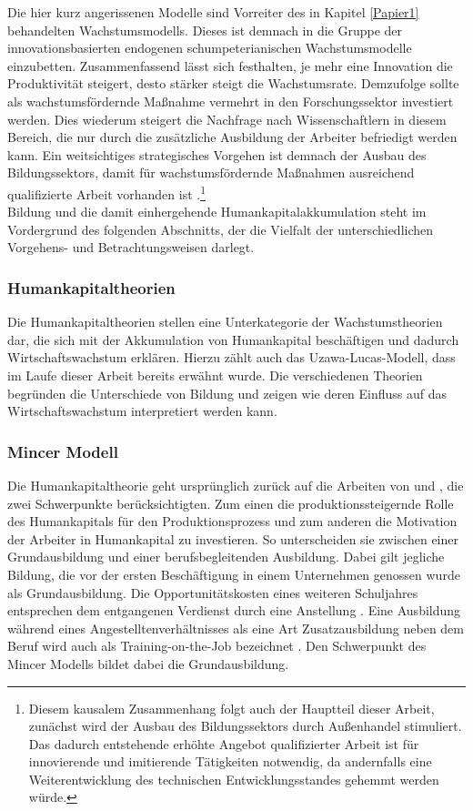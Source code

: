 %
Die hier kurz angerissenen Modelle sind Vorreiter des in Kapitel \ref{Papier1} behandelten Wachstumsmodells. Dieses ist demnach in die Gruppe der innovationsbasierten endogenen schumpeterianischen Wachstumsmodelle einzubetten. 
%
Zusammenfassend lässt sich festhalten, je mehr eine Innovation die Produktivität steigert, desto stärker steigt die Wachstumsrate. Demzufolge sollte als wachstumsfördernde Maßnahme vermehrt in den Forschungssektor investiert werden. Dies wiederum steigert die Nachfrage nach Wissenschaftlern in diesem Bereich, die nur durch die zusätzliche Ausbildung der Arbeiter befriedigt werden kann. Ein weitsichtiges strategisches Vorgehen ist demnach der Ausbau des Bildungssektors, damit für wachstumsfördernde Maßnahmen ausreichend qualifizierte Arbeit vorhanden ist \cite[Kapitel 4]{Aghion.2015}.\footnote{Diesem kausalem Zusammenhang folgt auch der Hauptteil dieser Arbeit, zunächst wird der Ausbau des Bildungssektors durch Außenhandel stimuliert. Das dadurch entstehende erhöhte Angebot qualifizierter Arbeit ist für innovierende und imitierende Tätigkeiten notwendig, da andernfalls eine Weiterentwicklung des technischen Entwicklungsstandes gehemmt werden würde.} \\
%
Bildung und die damit einhergehende Humankapitalakkumulation steht im Vordergrund des folgenden Abschnitts, der die Vielfalt der unterschiedlichen Vorgehens- und Betrachtungsweisen darlegt. 
%
\subsubsection{Humankapitaltheorien}
Die Humankapitaltheorien stellen eine Unterkategorie der Wachstumstheorien dar, die sich mit der Akkumulation von Humankapital beschäftigen und dadurch Wirtschaftswachstum erklären. Hierzu zählt auch das Uzawa-Lucas-Modell, dass im Laufe dieser Arbeit bereits erwähnt wurde. Die verschiedenen Theorien begründen die Unterschiede von Bildung und zeigen wie deren Einfluss auf das Wirtschaftswachstum interpretiert werden kann.
%
\subsubsection*{Mincer Modell}
Die Humankapitaltheorie geht ursprünglich zurück auf die Arbeiten von \cite{Becker.1965} und \cite{Mincer.1974}, die zwei Schwerpunkte berücksichtigten. Zum einen die  produktionssteigernde Rolle des Humankapitals für den Produktionsprozess und zum anderen die Motivation der Arbeiter in Humankapital zu investieren. So unterscheiden sie zwischen einer Grundausbildung und einer berufsbegleitenden Ausbildung. Dabei gilt jegliche Bildung, die vor der ersten Beschäftigung in einem Unternehmen genossen wurde als Grundausbildung. Die Opportunitätskosten eines weiteren Schuljahres entsprechen dem entgangenen Verdienst durch eine Anstellung \cite{Mincer.1974}. Eine Ausbildung während eines Angestelltenverhältnisses als eine Art Zusatzausbildung neben dem Beruf wird auch als Training-on-the-Job bezeichnet \cite{Acemoglu.2009}. Den Schwerpunkt des Mincer Modells bildet dabei die Grundausbildung.
%
